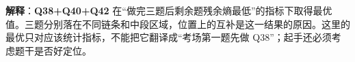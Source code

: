 \textbf{解释}：\textbf{Q38+Q40+Q42} 在“做完三题后剩余题残余熵最低”的指标下取得最优值。三题分别落在不同链条和中段区域，位置上的互补是这一结果的原因。这里的最优只对应该统计指标，不能把它翻译成“考场第一题先做 Q38”；起手还必须考虑题干是否好定位。